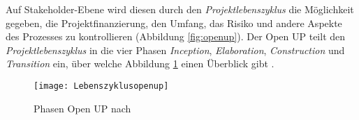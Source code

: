 Auf Stakeholder-Ebene wird diesen durch den \textit{Projektlebenszyklus} die Möglichkeit gegeben, die Projektfinanzierung, den Umfang, das Risiko und andere Aspekte des Prozesses zu kontrollieren (Abbildung \ref{fig:openup}).
Der Open UP teilt den \textit{Projektlebenszyklus} in die vier Phasen \textit{Inception}, \textit{Elaboration}, \textit{Construction} und \textit{Transition} ein, über welche Abbildung \ref{fig:Phasen} einen Überblick gibt \cite{eclipseopenup}.

\begin{figure}[htp]
\begin{center}
  \texttt{[image: Lebenszyklusopenup]} %
  \caption{Phasen Open UP nach \cite{eclipseopenup}}
  \label{fig:Phasen}
\end{center}
\end{figure}


